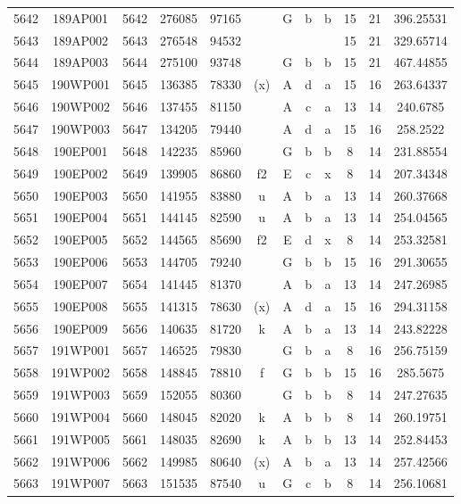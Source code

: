 \begin{tabular}{|*{12}{c|}}
5642 & 189AP001 & 5642 & 276085 & 97165 &  & G & b & b & 15 & 21 & 396.25531 \\ 
5643 & 189AP002 & 5643 & 276548 & 94532 &  &  &  &  & 15 & 21 & 329.65714 \\ 
5644 & 189AP003 & 5644 & 275100 & 93748 &  & G & b & b & 15 & 21 & 467.44855 \\ 
5645 & 190WP001 & 5645 & 136385 & 78330 & (x) & A & d & a & 15 & 16 & 263.64337 \\ 
5646 & 190WP002 & 5646 & 137455 & 81150 &  & A & c & a & 13 & 14 & 240.6785 \\ 
5647 & 190WP003 & 5647 & 134205 & 79440 &  & A & d & a & 15 & 16 & 258.2522 \\ 
5648 & 190EP001 & 5648 & 142235 & 85960 &  & G & b & b & 8 & 14 & 231.88554 \\ 
5649 & 190EP002 & 5649 & 139905 & 86860 & f2 & E & c & x & 8 & 14 & 207.34348 \\ 
5650 & 190EP003 & 5650 & 141955 & 83880 & u & A & b & a & 13 & 14 & 260.37668 \\ 
5651 & 190EP004 & 5651 & 144145 & 82590 & u & A & b & a & 13 & 14 & 254.04565 \\ 
5652 & 190EP005 & 5652 & 144565 & 85690 & f2 & E & d & x & 8 & 14 & 253.32581 \\ 
5653 & 190EP006 & 5653 & 144705 & 79240 &  & G & b & b & 15 & 16 & 291.30655 \\ 
5654 & 190EP007 & 5654 & 141445 & 81370 &  & A & b & a & 13 & 14 & 247.26985 \\ 
5655 & 190EP008 & 5655 & 141315 & 78630 & (x) & A & d & a & 15 & 16 & 294.31158 \\ 
5656 & 190EP009 & 5656 & 140635 & 81720 & k & A & b & a & 13 & 14 & 243.82228 \\ 
5657 & 191WP001 & 5657 & 146525 & 79830 &  & G & b & a & 8 & 16 & 256.75159 \\ 
5658 & 191WP002 & 5658 & 148845 & 78810 & f & G & b & b & 15 & 16 & 285.5675 \\ 
5659 & 191WP003 & 5659 & 152055 & 80360 &  & G & b & b & 8 & 14 & 247.27635 \\ 
5660 & 191WP004 & 5660 & 148045 & 82020 & k & A & b & b & 8 & 14 & 260.19751 \\ 
5661 & 191WP005 & 5661 & 148035 & 82690 & k & A & b & b & 13 & 14 & 252.84453 \\ 
5662 & 191WP006 & 5662 & 149985 & 80640 & (x) & A & b & a & 13 & 14 & 257.42566 \\ 
5663 & 191WP007 & 5663 & 151535 & 87540 & u & G & c & b & 8 & 14 & 256.10681 \\ 

\end{tabular}
